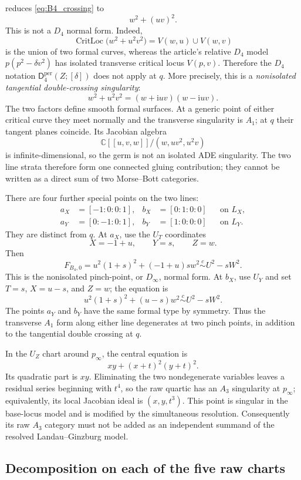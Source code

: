 \documentclass[11pt]{amsart}
\theoremstyle{definition}
\theoremstyle{remark}
\DeclareMathOperator{\CritLoc}{CritLoc}
\newcommand{\Dper}[3]{\mathsf{D}^{\mathrm{per}}_{#2}(#1;[#3])}
\begin{document}
reduces \eqref{eq:B4_crossing} to
\[
w^2+(uv)^2.
\]
This is not a $D_4$ normal form.  Indeed,
\[
\CritLoc\bigl(w^2+u^2v^2\bigr)
=V(w,u)\cup V(w,v)
\]
is the union of two formal curves, whereas the article's relative $D_4$
model $p(p^2-\delta v^2)$ has isolated transverse critical locus
$V(p,v)$.  Therefore the $D_4$ notation $\Dper{Z}{4}{\delta}$ does not apply
at $q$.  More precisely, this is a \emph{nonisolated tangential
double-crossing singularity}:
\[
w^2+u^2v^2=(w+\mathrm iuv)(w-\mathrm iuv).
\]
The two factors define smooth formal surfaces.  At a generic point of either
critical curve they meet normally and the transverse singularity is $A_1$;
at $q$ their tangent planes coincide.  Its Jacobian algebra
\[
\mathbb C[[u,v,w]]/(w,uv^2,u^2v)
\]
is infinite-dimensional, so the germ is not an isolated ADE singularity.
The two line strata therefore form one connected gluing contribution; they
cannot be written as a direct sum of two Morse--Bott categories.

There are four further special points on the two lines:
\[
\begin{aligned}
a_X&=[-1:0:0:1],& b_X&=[0:1:0:0] &&\text{on }L_X,\\
a_Y&=[0:-1:0:1],& b_Y&=[1:0:0:0] &&\text{on }L_Y.
\end{aligned}
\]
They are distinct from $q$.  At $a_X$, use the $U_T$ coordinates
\[
X=-1+u,\qquad Y=s,\qquad Z=w.
\]
Then
\[
F_{B_4,0}=u^2(1+s)^2+(-1+u)s w^2
\overset{c}{\sim}U^2-sW^2.
\]
This is the nonisolated pinch-point, or $D_\infty$, normal form.  At $b_X$,
use $U_Y$ and set $T=s$, $X=u-s$, and $Z=w$; the equation is
\[
u^2(1+s)^2+(u-s)w^2
\overset{c}{\sim}U^2-sW^2.
\]
The points $a_Y$ and $b_Y$ have the same formal type by symmetry.  Thus the
transverse $A_1$ form along either line degenerates at two pinch points, in
addition to the tangential double crossing at $q$.

In the $U_Z$ chart around $p_\infty$, the central equation is
\[
xy+(x+t)^2(y+t)^2.
\]
Its quadratic part is $xy$.  Eliminating the two nondegenerate variables
leaves a residual series beginning with $t^4$, so the raw quartic has an
$A_3$ singularity at $p_\infty$; equivalently, its local Jacobian ideal is
$(x,y,t^3)$.  This point is singular in the base-locus
model and is modified by the simultaneous resolution.  Consequently its raw
$A_3$ category must not be added as an independent summand of the resolved
Landau--Ginzburg model.

\subsection{Decomposition on each of the five raw charts}
\end{document}
